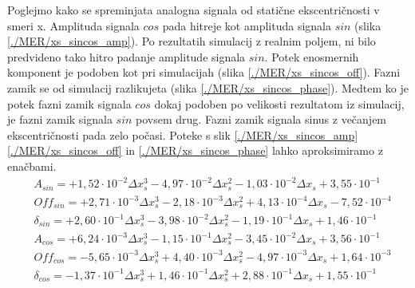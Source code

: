 Poglejmo kako se spreminjata analogna signala od statične ekscentričnosti v smeri x. Amplituda signala $cos$ pada hitreje kot amplituda signala $sin$ (slika \ref{./MER/xs_sincos_amp}). Po rezultatih simulacij z realnim poljem, ni bilo predvideno tako hitro padanje amplitude signala $sin$. Potek enosmernih komponent je podoben kot pri simulacijah (slika \ref{./MER/xs_sincos_off}). Fazni zamik se od simulacij razlikujeta (slika \ref{./MER/xs_sincos_phase}). Medtem ko je potek fazni zamik signala $cos$ dokaj podoben po velikosti rezultatom iz simulacij, je fazni zamik signala $sin$ povsem drug. Fazni zamik signala sinus z večanjem ekscentričnosti pada zelo počasi.
Poteke s slik \ref{./MER/xs_sincos_amp} \ref{./MER/xs_sincos_off} in \ref{./MER/xs_sincos_phase} lahko aproksimiramo z enačbami. 
\begin{eqnarray}
&A_{sin} = +1,52\cdot 10^{-2}\Delta x_s^3-4,97\cdot 10^{-2}\Delta x_s^2-1,03\cdot 10^{-2}\Delta x_s+3,55\cdot 10^{-1}\\     
&Off_{sin} = +2,71\cdot 10^{-3}\Delta x_s^3-2,18\cdot 10^{-3}\Delta x_s^2+4,13\cdot 10^{-4}\Delta x_s-7,52\cdot 10^{-4}\\   
&\delta_{sin} = +2,60\cdot 10^{-1}\Delta x_s^3-3,98\cdot 10^{-2}\Delta x_s^2-1,19\cdot 10^{-1}\Delta x_s+1,46\cdot 10^{-1}\\
&A_{cos} = +6,24\cdot 10^{-3}\Delta x_s^3-1,15\cdot 10^{-1}\Delta x_s^2-3,45\cdot 10^{-2}\Delta x_s+3,56\cdot 10^{-1}\\     
&Off_{cos} = -5,65\cdot 10^{-3}\Delta x_s^3+4,40\cdot 10^{-3}\Delta x_s^2-4,97\cdot 10^{-3}\Delta x_s+1,64\cdot 10^{-3}\\   
&\delta_{cos} = -1,37\cdot 10^{-1}\Delta x_s^3+1,46\cdot 10^{-1}\Delta x_s^2+2,88\cdot 10^{-1}\Delta x_s+1,55\cdot 10^{-1}  
\end{eqnarray}

